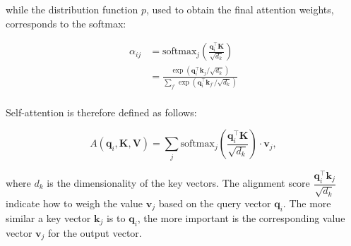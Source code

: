 \noindent while the distribution function $p$, used to obtain the final attention weights, corresponds to the softmax: 

\begin{equation}
    \begin{aligned}
        \alpha_{ij} &= \textrm{softmax}_j\left(\frac{\bm{q}_i^{\top} \bm{K}}{\sqrt{d_k}}\right) \\
                    &= \frac{\exp\left(\bm{q}^{\top}_i \bm{k}_j / \sqrt{d_k}\right)}{\sum_{j'} \exp \left(\bm{q}^{\top}_i \bm{k}_{j'} / \sqrt{d_k}\right)} \\
\end{aligned}
\end{equation}

\noindent Self-attention is therefore defined as follows:

\begin{equation}
    A(\bm{q}_i, \bm{K}, \bm{V}) = \sum_j \textrm{softmax}_j\left(\frac{\bm{q}_i^{\top} \bm{K}}{\sqrt{d_k}}\right) \cdot \bm{v}_j,
\label{equation:self-attention}
\end{equation}


\noindent where $d_k$ is the dimensionality of the key vectors. The alignment score $\dfrac{\bm{q}_i^{\top} \bm{k}_j}{\sqrt{d_k}}$ indicate how to weigh the value $\bm{v}_j$ based on the query vector $\bm{q}_i$. The more similar a key vector $\bm{k}_j$ is to $\bm{q}_i$, the more important is the corresponding value vector $\bm{v}_j$ for the output vector. 



